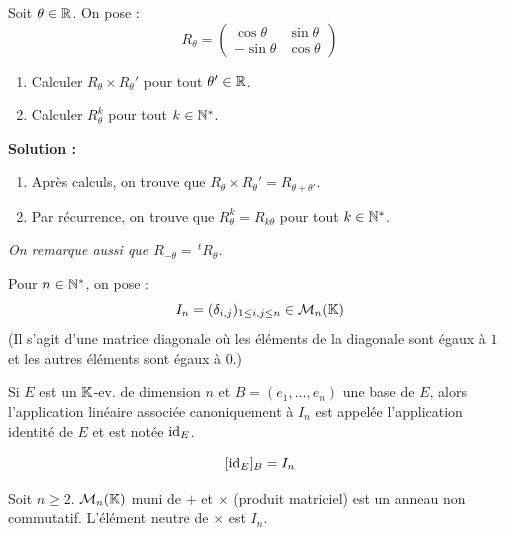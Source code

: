 \documentclass[12pt, a4paper]{report}
\begin{document}
\begin{exercise}
    Soit $\theta \in \mathbb{R}$. On pose :
    $$R_\theta = \left(\begin{matrix} \cos\theta & \sin\theta \\ -\sin\theta & \cos\theta \end{matrix}\right)$$

    \begin{enumerate}
        \item Calculer $R_\theta \times R_\theta'$ pour tout $\theta' \in \mathbb{R}$.
        \item Calculer $R_\theta^k$ pour tout $k \in \mathbb{N}^*$.
    \end{enumerate}

    \textbf{Solution :}
    \begin{enumerate}
        \item Après calculs, on trouve que $R_\theta \times R_\theta' = R_{\theta + \theta'}$.
        \item Par récurrence, on trouve que $R_\theta^k = R_{k\theta}$ pour tout $k \in \mathbb{N}^*$.
    \end{enumerate}

    \textit{On remarque aussi que $R_{-\theta} = \,^tR_\theta$.}
\end{exercise}

\begin{definition}
    Pour $n \in \mathbb{N}^*$, on pose :
    $$I_n = (\delta_{i,j})_{1 \le i,j \le n} \in \mathcal M_n(\mathbb{K})$$
    (Il s'agit d'une matrice diagonale où les éléments de la diagonale sont égaux à $1$ et les autres éléments sont égaux à $0$.)

    Si $E$ est un $\mathbb{K}$-ev. de dimension $n$ et $B=(e_1,\dots,e_n)$ une base de $E$, alors l'application linéaire associée canoniquement à $I_n$ est appelée l'application identité de $E$ et est notée $\mathrm{id}_E$.

    $$[\mathrm{id}_E]_B = I_n$$
\end{definition}

\begin{property}
    Soit $n \ge 2$. $\mathcal M_n(\mathbb{K})$ muni de $+$ et $\times$ (produit matriciel) est un anneau non commutatif. L'élément neutre de $\times$ est $I_n$.
\end{property}
\end{document}
